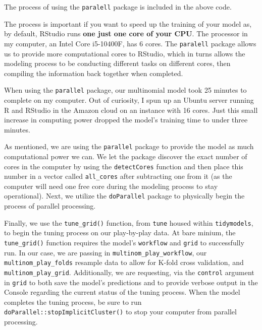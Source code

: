 \documentclass[
  letterpaper,
]{krantz}
\begin{document}
\begin{tcolorbox}[enhanced jigsaw, colback=white, leftrule=.75mm, breakable, colframe=quarto-callout-warning-color-frame, bottomtitle=1mm, rightrule=.15mm, left=2mm, opacityback=0, bottomrule=.15mm, arc=.35mm, coltitle=black, colbacktitle=quarto-callout-warning-color!10!white, toptitle=1mm, titlerule=0mm, title=\textcolor{quarto-callout-warning-color}{\faExclamationTriangle}\hspace{0.5em}{Warning}, toprule=.15mm, opacitybacktitle=0.6]

The process of using the \texttt{paralell} package is included in the
above code.

The process is important if you want to speed up the training of your
model as, by default, RStudio runs \textbf{one just one core of your
CPU}. The processor in my computer, an Intel Core i5-10400F, has 6
cores. The \texttt{paralell} package allows us to provide more
computational cores to RStudio, which in turns allows the modeling
process to be conducting different tasks on different cores, then
compiling the information back together when completed.

When using the \texttt{parallel} package, our multinomial model took 25
minutes to complete on my computer. Out of curiosity, I spun up an
Ubuntu server running R and RStudio in the Amazon cloud on an instance
with 16 cores. Just this small increase in computing power dropped the
model's training time to under three minutes.

\end{tcolorbox}

As mentioned, we are using the \texttt{parallel} package to provide the
model as much computational power we can. We let the package discover
the exact number of cores in the computer by using the
\texttt{detectCores} function and then place this number in a vector
called \texttt{all\_cores} after subtracting one from it (as the
computer will need one free core during the modeling process to stay
operational). Next, we utilize the \texttt{doParallel} package to
physically begin the process of parallel processing.

Finally, we use the \texttt{tune\_grid()} function, from \texttt{tune}
housed within \texttt{tidymodels}, to begin the tuning process on our
play-by-play data. At bare minium, the \texttt{tune\_grid()} function
requires the model's \texttt{workflow} and \texttt{grid} to successfully
run. In our case, we are passing in \texttt{multinom\_play\_workflow},
our \texttt{multinom\_play\_folds} resample data to allow for K-fold
cross validation, and \texttt{multinom\_play\_grid}. Additionally, we
are requesting, via the \texttt{control} argument in \texttt{grid} to
both save the model's predictions and to provide verbose output in the
Console regarding the current status of the tuning process. When the
model completes the tuning process, be sure to run
\texttt{doParallel::stopImplicitCluster()} to stop your computer from
parallel processing.
\end{document}
